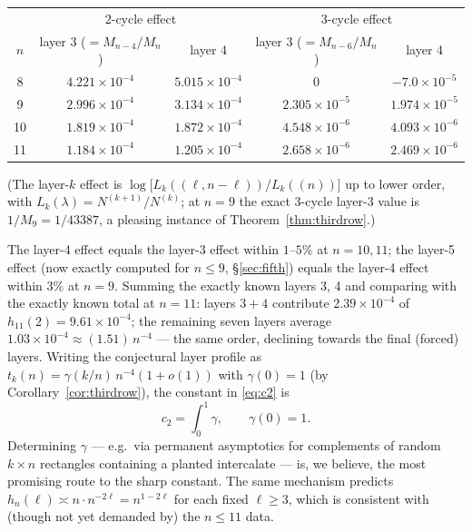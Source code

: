 \documentclass[11pt]{article}
\theoremstyle{definition}
\begin{document}
\begin{center}
\small
\begin{tabular}{c|cc|cc}
\toprule
 & \multicolumn{2}{c|}{$2$-cycle effect} & \multicolumn{2}{c}{$3$-cycle effect}\\
$n$ & layer 3 ($=M_{n-4}/M_n$) & layer 4 & layer 3 ($=M_{n-6}/M_n$) & layer 4\\
\midrule
8  & $4.221\times10^{-4}$ & $5.015\times10^{-4}$ & $0$ & $-7.0\times10^{-5}$\\
9  & $2.996\times10^{-4}$ & $3.134\times10^{-4}$ & $2.305\times10^{-5}$ & $1.974\times10^{-5}$\\
10 & $1.819\times10^{-4}$ & $1.872\times10^{-4}$ & $4.548\times10^{-6}$ & $4.093\times10^{-6}$\\
11 & $1.184\times10^{-4}$ & $1.205\times10^{-4}$ & $2.658\times10^{-6}$ & $2.469\times10^{-6}$\\
\bottomrule
\end{tabular}
\end{center}

\noindent
(The layer-$k$ effect is
$\log\bigl[L_k((\ell,n-\ell))/L_k((n))\bigr]$ up to lower order, with
$L_k(\lambda)=N^{(k+1)}/N^{(k)}$; at $n=9$ the exact $3$-cycle layer-3 value
is $1/M_9=1/43387$, a pleasing instance of Theorem~\ref{thm:thirdrow}.)

The layer-4 effect equals the layer-3 effect within $1\text{--}5\%$ at
$n=10,11$; the layer-5 effect (now exactly computed for $n\le9$,
\S\ref{sec:fifth}) equals the layer-4 effect within $3\%$ at $n=9$.
Summing the exactly known layers 3, 4 and comparing with the
exactly known total at $n=11$: layers $3+4$ contribute
$2.39\times10^{-4}$ of $h_{11}(2)=9.61\times10^{-4}$; the remaining seven
layers average $1.03\times10^{-4}\approx(1.51)\,n^{-4}$ --- the same order,
declining towards the final (forced) layers.  Writing the conjectural layer
profile as $t_k(n)= \gamma(k/n)\,n^{-4}(1+o(1))$ with $\gamma(0)=1$ (by
Corollary~\ref{cor:thirdrow}), the constant in \eqref{eq:c2} is
\[
c_2=\int_0^1 \gamma , \qquad \gamma(0)=1 .
\]
Determining $\gamma$ --- e.g.\ via permanent asymptotics for complements of
random $k\times n$ rectangles containing a planted intercalate --- is, we
believe, the most promising route to the sharp constant.  The same mechanism
predicts $h_n(\ell)\asymp n\cdot n^{-2\ell}=n^{1-2\ell}$ for each fixed
$\ell\ge3$, which is consistent with (though not yet demanded by) the
$n\le11$ data.
\end{document}
